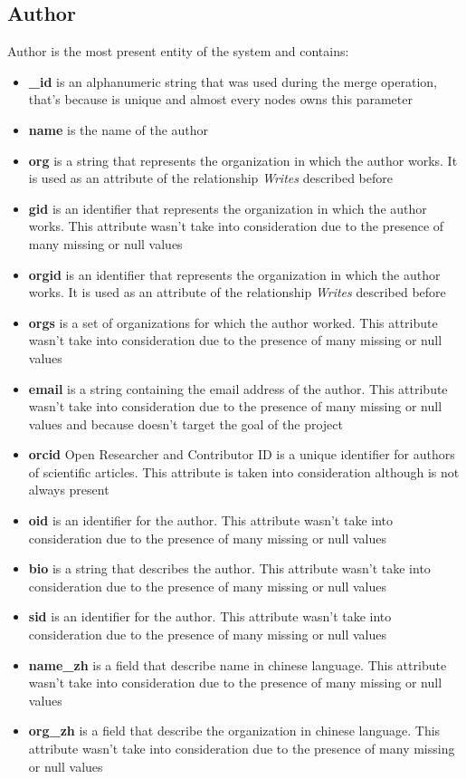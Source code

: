 \documentclass{Configuration_Files/PoliMi3i_thesis}
\begin{document}
\subsection{Author}
Author is the most present entity of the system and contains:
\begin{itemize}
    \item \textbf{\_id} is an alphanumeric string that was used during the merge operation, that's because is unique and
            almost every nodes owns this parameter
    \item \textbf{name} is the name of the author
    \item \textbf{org} is a string that represents the organization in which the author works. It is used as an attribute 
            of the relationship \emph{Writes} described before
    \item \textbf{gid} is an identifier that represents the organization in which the author works. This attribute wasn't
            take into consideration due to the presence of many missing or null values
    \item \textbf{orgid} is an identifier that represents the organization in which the author works. It is used as an 
            attribute of the relationship \emph{Writes} described before
    \item \textbf{orgs} is a set of organizations for which the author worked. This attribute wasn't take into 
            consideration due to the presence of many missing or null values
    \item \textbf{email} is a string containing the email address of the author. This attribute wasn't take into
            consideration due to the presence of many missing or null values and because doesn't target the goal of the 
            project
    \item \textbf{orcid} Open Researcher and Contributor ID is a unique identifier for authors of scientific articles.
            This attribute is taken into consideration although is not always present
    \item \textbf{oid} is an identifier for the author. This attribute wasn't take into consideration due to the
            presence of many missing or null values
    \item \textbf{bio} is a string that describes the author. This attribute wasn't take into consideration due to 
            the presence of many missing or null values   
    \item \textbf{sid} is an identifier for the author. This attribute wasn't take into consideration due to the
            presence of many missing or null values
    \item \textbf{name\_zh} is a field that describe name in chinese language. This attribute wasn't take
            into consideration due to the presence of many missing or null values
    \item \textbf{org\_zh} is a field that describe the organization in chinese language. This attribute
            wasn't take into consideration due to the presence of many missing or null values
\end{itemize}
\bigskip
\end{document}
